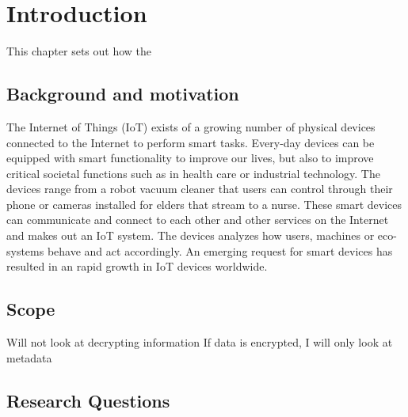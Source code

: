 \chapter*{Introduction}
This chapter sets out how the 
\section*{Background and motivation}
The Internet of Things (IoT) exists of a growing number of physical devices connected to the Internet to perform smart tasks. \cite{IoTSurveyAl-Fuqaha} Every-day devices can be equipped with smart functionality to improve our lives, but also to improve critical societal functions such as in health care or industrial technology. The devices range from a robot vacuum cleaner that users can control through their phone or cameras installed for elders that stream to a nurse. These smart devices can communicate and connect to each other and other services on the Internet and makes out an IoT system. The devices analyzes how users, machines or eco-systems behave and act accordingly. An emerging request for smart devices has resulted in an rapid growth in IoT devices worldwide. \cite{Statistics on this}
\\

\section*{Scope}
Will not look at decrypting information
If data is encrypted, I will only look at metadata

\section*{Research Questions}

